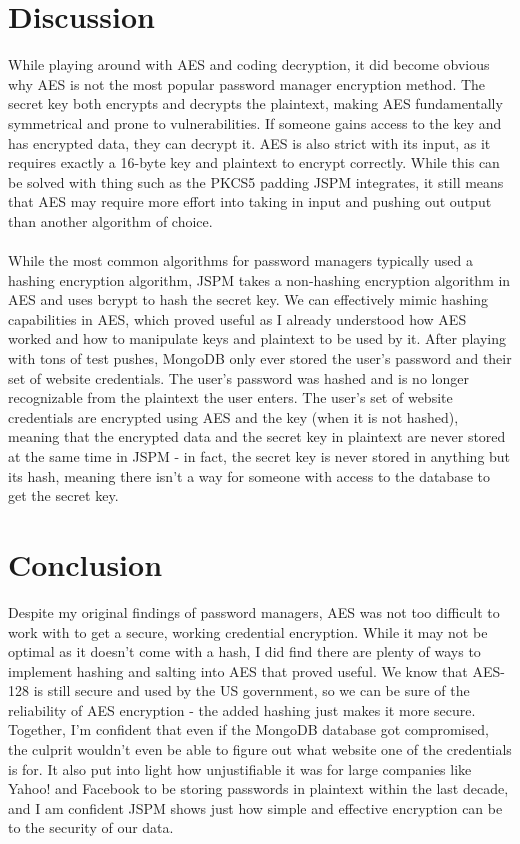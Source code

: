 \section{Discussion}
While playing around with AES and coding decryption, it did become obvious why AES is not the most popular password manager encryption method. The secret key both encrypts and decrypts the plaintext, making AES fundamentally symmetrical and prone to vulnerabilities. If someone gains access to the key and has encrypted data, they can decrypt it. AES is also strict with its input, as it requires exactly a 16-byte key and plaintext to encrypt correctly. While this can be solved with thing such as the PKCS5 padding JSPM integrates, it still means that AES may require more effort into taking in input and pushing out output than another algorithm of choice.\\\\
While the most common algorithms for password managers typically used a hashing encryption algorithm, JSPM takes a non-hashing encryption algorithm in AES and uses bcrypt to hash the secret key. We can effectively mimic hashing capabilities in AES, which proved useful as I already understood how AES worked and how to manipulate keys and plaintext to be used by it.
After playing with tons of test pushes, MongoDB only ever stored the user’s password and their set of website credentials. The user’s password was hashed and is no longer recognizable from the plaintext the user enters. The user’s set of website credentials are encrypted using AES and the key (when it is not hashed), meaning that the encrypted data and the secret key in plaintext are never stored at the same time in JSPM - in fact, the secret key is never stored in anything but its hash, meaning there isn’t a way for someone with access to the database to get the secret key.

\section{Conclusion}
Despite my original findings of password managers, AES was not too difficult to work with to get a secure, working credential encryption. While it may not be optimal as it doesn’t come with a hash, I did find there are plenty of ways to implement hashing and salting into AES that proved useful. We know that AES-128 is still secure and used by the US government, so we can be sure of the reliability of AES encryption - the added hashing just makes it more secure. Together, I’m confident that even if the MongoDB database got compromised, the culprit wouldn’t even be able to figure out what website one of the credentials is for. It also put into light how unjustifiable it was for large companies like Yahoo! and Facebook to be storing passwords in plaintext within the last decade, and I am confident JSPM shows just how simple and effective encryption can be to the security of our data.
